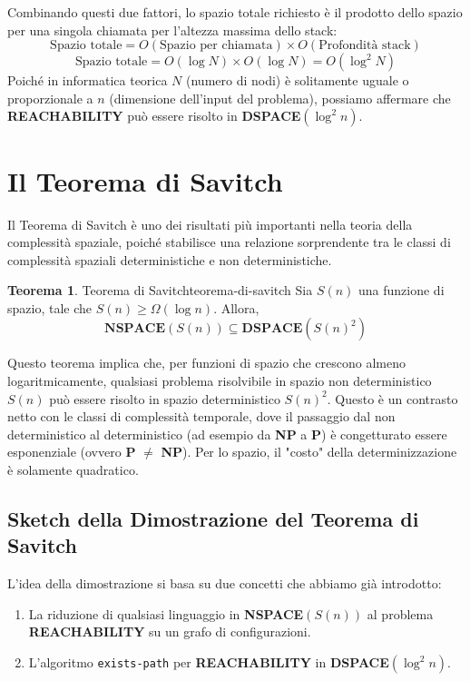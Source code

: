 \documentclass[a4paper]{article}
\theoremstyle{definition} %
\newtheorem{theorem}{Teorema}
\begin{document}
Combinando questi due fattori, lo spazio totale richiesto è il prodotto dello spazio per una singola chiamata per l'altezza massima dello stack:
\[ \text{Spazio totale} = O(\text{Spazio per chiamata}) \times O(\text{Profondità stack}) \]
\[ \text{Spazio totale} = O(\log N) \times O(\log N) = O(\log^2 N) \]
Poiché in informatica teorica $N$ (numero di nodi) è solitamente uguale o proporzionale a $n$ (dimensione dell'input del problema), possiamo affermare che \textbf{REACHABILITY} può essere risolto in \textbf{DSPACE}$(\log^2 n)$.

\section{Il Teorema di Savitch}
Il Teorema di Savitch è uno dei risultati più importanti nella teoria della complessità spaziale, poiché stabilisce una relazione sorprendente tra le classi di complessità spaziali deterministiche e non deterministiche.

\begin{theorem}{Teorema di Savitch}{teorema-di-savitch}
Sia $S(n)$ una funzione di spazio, tale che $S(n) \geq \Omega(\log n)$. Allora,
\[ \mathbf{NSPACE}(S(n)) \subseteq \mathbf{DSPACE}(S(n)^2) \]
\end{theorem}

Questo teorema implica che, per funzioni di spazio che crescono almeno logaritmicamente, qualsiasi problema risolvibile in spazio non deterministico $S(n)$ può essere risolto in spazio deterministico $S(n)^2$. Questo è un contrasto netto con le classi di complessità temporale, dove il passaggio dal non deterministico al deterministico (ad esempio da \textbf{NP} a \textbf{P}) è congetturato essere esponenziale (ovvero \textbf{P} $\ne$ \textbf{NP}). Per lo spazio, il "costo" della determinizzazione è solamente quadratico.

\subsection{Sketch della Dimostrazione del Teorema di Savitch}
L'idea della dimostrazione si basa su due concetti che abbiamo già introdotto:
\begin{enumerate}
    \item La riduzione di qualsiasi linguaggio in \textbf{NSPACE}$(S(n))$ al problema \textbf{REACHABILITY} su un grafo di configurazioni.
    \item L'algoritmo \texttt{exists-path} per \textbf{REACHABILITY} in \textbf{DSPACE}$(\log^2 n)$.
\end{enumerate}
\end{document}
